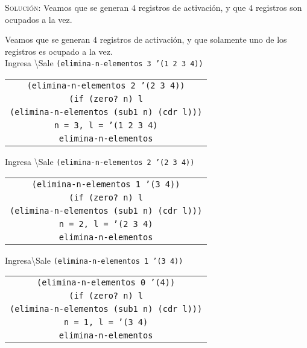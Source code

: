\documentclass[letterpaper,11pt]{article}
\begin{document}
\begin{enumerate}
\begin{enumerate}
        \textsc{Solución:} Veamos que se generan $4$ registros de activación, y 
        que $4$ registros son ocupados a la vez.

        Veamos que se generan $4$ registros de activación, y que solamente uno 
        de los registros es ocupado a la vez.\\ 
            Ingresa \textbackslash Sale \texttt{(elimina-n-elementos 3 '(1 2 3 4))}
            \begin{center}
            \begin{tabular}[h]{|c|}
                \hline
                \texttt{(elimina-n-elementos 2 '(2 3 4))} \\
                \texttt{(if (zero? n) l} \\
                \texttt{(elimina-n-elementos (sub1 n) (cdr l)))} \\
                \texttt{n = 3, l = '(1 2 3 4)} \\
                \texttt{elimina-n-elementos} \\
                \hline
            \end{tabular}
        \end{center}
        
        Ingresa \textbackslash Sale \texttt{(elimina-n-elementos 2 '(2 3 4))}
        \begin{center}
            \begin{tabular}[h]{|c|}
                \hline
                \texttt{(elimina-n-elementos 1 '(3 4))} \\
                \texttt{(if (zero? n) l} \\
                \texttt{(elimina-n-elementos (sub1 n) (cdr l)))} \\
                \texttt{n = 2, l = '(2 3 4)} \\
                \texttt{elimina-n-elementos} \\
                \hline
            \end{tabular}
        \end{center}
        Ingresa\textbackslash Sale \texttt{(elimina-n-elementos 1 '(3 4))}
        \begin{center}
            \begin{tabular}[h]{|c|}
                \hline
                \texttt{(elimina-n-elementos 0 '(4))} \\
                \texttt{(if (zero? n) l} \\
                \texttt{(elimina-n-elementos (sub1 n) (cdr l)))} \\
                \texttt{n = 1, l = '(3 4)} \\
                \texttt{elimina-n-elementos} \\
                \hline
            \end{tabular}
        \end{center}


\end{enumerate}
\end{enumerate}
\end{document}
